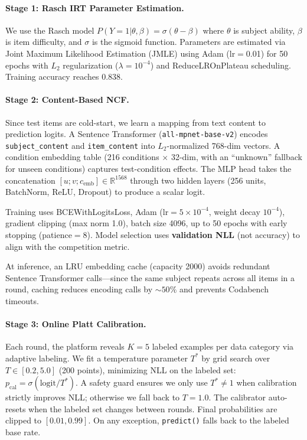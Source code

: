 \documentclass{article}
\begin{document}
\paragraph{Stage 1: Rasch IRT Parameter Estimation.}
We use the Rasch model $P(Y=1|\theta,\beta) = \sigma(\theta - \beta)$ where $\theta$ is subject ability, $\beta$ is item difficulty, and $\sigma$ is the sigmoid function.
Parameters are estimated via Joint Maximum Likelihood Estimation (JMLE) using Adam (lr$=$0.01) for 50 epochs with $L_2$ regularization ($\lambda=10^{-4}$) and ReduceLROnPlateau scheduling.
Training accuracy reaches 0.838.

\paragraph{Stage 2: Content-Based NCF.}
Since test items are cold-start, we learn a mapping from text content to prediction logits.
A Sentence Transformer (\texttt{all-mpnet-base-v2}) encodes \texttt{subject\_content} and \texttt{item\_content} into $L_2$-normalized 768-dim vectors.
A condition embedding table (216 conditions $\times$ 32-dim, with an ``unknown'' fallback for unseen conditions) captures test-condition effects.
The MLP head takes the concatenation $[u; v; c_\text{emb}] \in \mathbb{R}^{1568}$ through two hidden layers (256 units, BatchNorm, ReLU, Dropout) to produce a scalar logit.

Training uses BCEWithLogitsLoss, Adam (lr$=5 \times 10^{-4}$, weight decay $10^{-4}$), gradient clipping (max norm 1.0), batch size 4096, up to 50 epochs with early stopping (patience$=$8).
Model selection uses \textbf{validation NLL} (not accuracy) to align with the competition metric.

At inference, an LRU embedding cache (capacity 2000) avoids redundant Sentence Transformer calls---since the same subject repeats across all items in a round, caching reduces encoding calls by ${\sim}50\%$ and prevents Codabench timeouts.

\paragraph{Stage 3: Online Platt Calibration.}
Each round, the platform reveals $K{=}5$ labeled examples per data category via adaptive labeling.
We fit a temperature parameter $T^*$ by grid search over $T \in [0.2, 5.0]$ (200 points), minimizing NLL on the labeled set:
$p_\text{cal} = \sigma(\text{logit} / T^*)$.
A safety guard ensures we only use $T^* \neq 1$ when calibration strictly improves NLL; otherwise we fall back to $T{=}1.0$.
The calibrator auto-resets when the labeled set changes between rounds.
Final probabilities are clipped to $[0.01, 0.99]$.
On any exception, \texttt{predict()} falls back to the labeled base rate.
\end{document}
